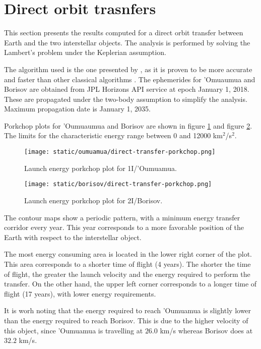 \section{Direct orbit trasnfers}

This section presents the results computed for a direct orbit transfer between
Earth and the two interstellar objects. The analysis is performed by solving the
Lambert's problem under the Keplerian assumption.

The algorithm used is the one presented by \cite{izzo2015}, as it is proven to
be more accurate and faster than other classical algorithms \cite{martinez2021}.
The ephemerides for 'Omuaumua and Borisov are obtained from JPL Horizons API
service at epoch January 1, 2018. These are propagated under the two-body
assumption to simplify the analysis. Maximum propagation date is January 1,
2035.

Porkchop plots for 'Oumuaumua and Borisov are shown in figure
\ref{fig:oumuamua-direct-transfer-porkchop} and figure
\ref{fig:borisov-direct-transfer-porkchop}. The limits for the characteristic
energy range between 0 and 12000 km$^2$/s$^2$.

\begin{figure}[H]
  \centering
  \texttt{[image: static/oumuamua/direct-transfer-porkchop.png]}
  \caption{Launch energy porkchop plot for 1I/'Oumuamua.}
  \label{fig:oumuamua-direct-transfer-porkchop}
\end{figure}
\begin{figure}[H]
  \centering
  \texttt{[image: static/borisov/direct-transfer-porkchop.png]}
  \caption{Launch energy porkchop plot for 2I/Borisov.}
  \label{fig:borisov-direct-transfer-porkchop}
\end{figure}

The contour maps show a periodic pattern, with a minimum energy transfer
corridor every year. This year corresponds to a more favorable position of the
Earth with respect to the interstellar object.

The most energy consuming area is located in the lower right corner of the plot.
This area corresponds to a shorter time of flight (4 years). The shorter the time of
flight, the greater the launch velocity and the energy required to perform the
transfer. On the other hand, the upper left corner corresponds to a longer time
of flight (17 years), with lower energy requirements.

It is worh noting that the energy required to reach 'Oumuamua is slightly lower
than the energy required to reach Borisov. This is due to the higher velocity of
this object, since 'Oumuamua is travelling at $26.0$ km/s whereas Borisov does
at $32.2$ km/s.

